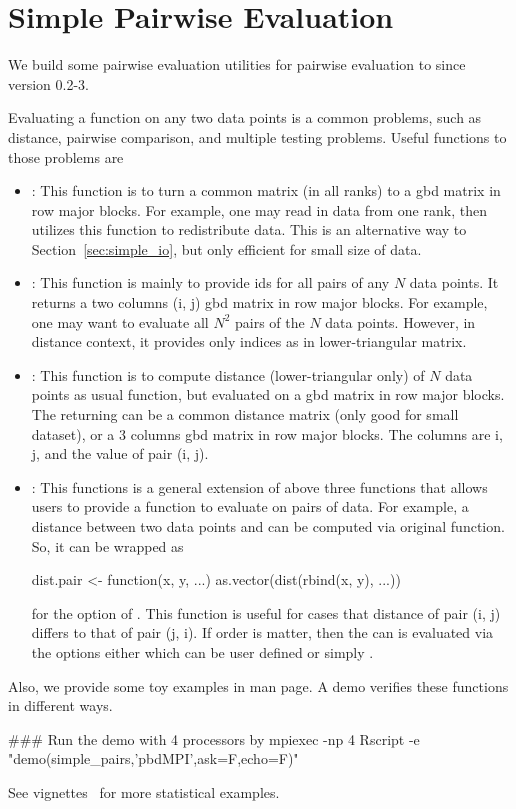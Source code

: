 
\section[Simple Pairwise Evaluation]{Simple Pairwise Evaluation}
\label{sec:simple_pairs}

We build some pairwise evaluation utilities for pairwise evaluation to
 since version 0.2-3.

Evaluating a function on any two data points is a common problems, such as
distance, pairwise comparison, and multiple testing problems.
Useful functions to those problems are
\begin{itemize}
\item
{}:
This function is to turn a common matrix (in all ranks)
to a gbd matrix in row major blocks. For example, one may read in data
from one rank, then utilizes this function to redistribute data. This is
an alternative way to Section~\ref{sec:simple_io}, but only efficient for
small size of data.

\item
{}:
This function is mainly to provide ids for all pairs of any $N$ data points.
It returns a two columns (i, j)  gbd matrix in row major blocks.
For example, one may want to evaluate all $N^2$ pairs of the $N$ data points.
However, in distance context, it provides only indices as in lower-triangular
matrix.

\item
{}:
This function is to compute distance (lower-triangular only) of $N$ data points
as usual  function, but evaluated on a gbd matrix in row major
blocks. The returning can be a common distance matrix (only good for small
dataset), or a 3 columns gbd matrix in row major blocks. The columns are
i, j, and the value of pair (i, j).

\item
{}:
This functions is a general extension of above three functions that allows
users to provide a function  to evaluate on pairs of data.
For example, a distance between two data points  and 
can be computed via original  function. So, it can be wrapped as
\begin{Code}
dist.pair <- function(x, y, ...){
  as.vector(dist(rbind(x, y), ...))
}
\end{Code}
for the  option of .
This function is useful for cases that distance of pair (i, j)
differs to that of pair (j, i). If order is matter, then the 
can is evaluated via the options either 
which can be user defined or simply .
\end{itemize}

Also, we provide some toy examples in man page. A demo verifies these
functions in different ways.
\begin{Command}
### Run the demo with 4 processors by
mpiexec -np 4 Rscript -e "demo(simple_pairs,'pbdMPI',ask=F,echo=F)"
\end{Command}
See  vignettes~\citep{Schmidt2013pbdDEMOvignette}
for more statistical examples.

